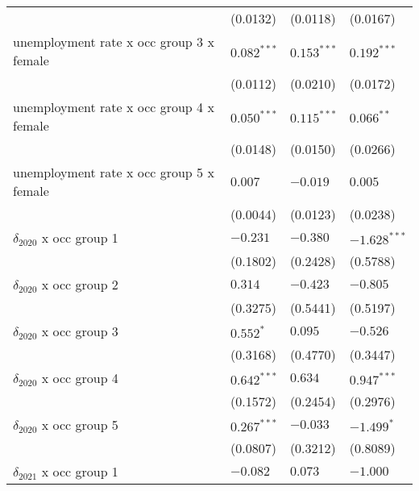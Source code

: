 \begin{tabular}{llll}
                                         &           (0.0132) &           (0.0118) &           (0.0167) \\
unemployment rate x occ group 3 x female &      $0.082^{***}$ &      $0.153^{***}$ &      $0.192^{***}$ \\
                                         &           (0.0112) &           (0.0210) &           (0.0172) \\
unemployment rate x occ group 4 x female &      $0.050^{***}$ &      $0.115^{***}$ &       $0.066^{**}$ \\
                                         &           (0.0148) &           (0.0150) &           (0.0266) \\
unemployment rate x occ group 5 x female &            $0.007$ &           $-0.019$ &            $0.005$ \\
                                         &           (0.0044) &           (0.0123) &           (0.0238) \\
$\delta_{2020}$ x occ group 1            &           $-0.231$ &           $-0.380$ &     $-1.628^{***}$ \\
                                         &           (0.1802) &           (0.2428) &           (0.5788) \\
$\delta_{2020}$ x occ group 2            &            $0.314$ &           $-0.423$ &           $-0.805$ \\
                                         &           (0.3275) &           (0.5441) &           (0.5197) \\
$\delta_{2020}$ x occ group 3            &          $0.552^*$ &            $0.095$ &           $-0.526$ \\
                                         &           (0.3168) &           (0.4770) &           (0.3447) \\
$\delta_{2020}$ x occ group 4            &      $0.642^{***}$ &            $0.634$ &      $0.947^{***}$ \\
                                         &           (0.1572) &           (0.2454) &           (0.2976) \\
$\delta_{2020}$ x occ group 5            &      $0.267^{***}$ &           $-0.033$ &         $-1.499^*$ \\
                                         &           (0.0807) &           (0.3212) &           (0.8089) \\
$\delta_{2021}$ x occ group 1            &           $-0.082$ &            $0.073$ &           $-1.000$ \\

\end{tabular}
